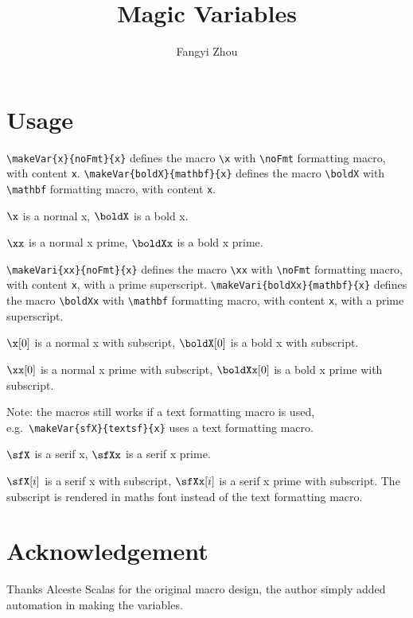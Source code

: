 \documentclass{article}
\title{Magic Variables}
\author{Fangyi Zhou}
\begin{document}
\maketitle
\section{Usage}

\verb+\makeVar{x}{noFmt}{x}+ defines the macro \verb+\x+ with \verb+\noFmt+
formatting macro, with content \verb+x+.
\verb+\makeVar{boldX}{mathbf}{x}+ defines the macro \verb+\boldX+ with
\verb+\mathbf+ formatting macro, with content \verb+x+.

$\x$ is a normal x, $\boldX$ is a bold x.

$\xx$ is a normal x prime, $\boldXx$ is a bold x prime.

\verb+\makeVari{xx}{noFmt}{x}+ defines the macro \verb+\xx+ with \verb+\noFmt+
formatting macro, with content \verb+x+, with a prime superscript.
\verb+\makeVari{boldXx}{mathbf}{x}+ defines the macro \verb+\boldXx+ with
\verb+\mathbf+ formatting macro, with content \verb+x+, with a prime
superscript.

$\x[0]$ is a normal x with subscript, $\boldX[0]$ is a bold x with subscript.

$\xx[0]$ is a normal x prime with subscript, $\boldXx[0]$ is a bold x prime
with subscript.

Note: the macros still works if a text formatting macro is used, e.g.\
\verb+\makeVar{sfX}{textsf}{x}+ uses a text formatting macro.

$\sfX$ is a serif x, $\sfXx$ is a serif x prime.

$\sfX[i]$ is a serif x with subscript, $\sfXx[i]$ is a serif x prime with
subscript.
The subscript is rendered in maths font instead of the text formatting macro.

\section*{Acknowledgement}

Thanks Alceste Scalas for the original macro design, the author simply added
automation in making the variables.
\end{document}

